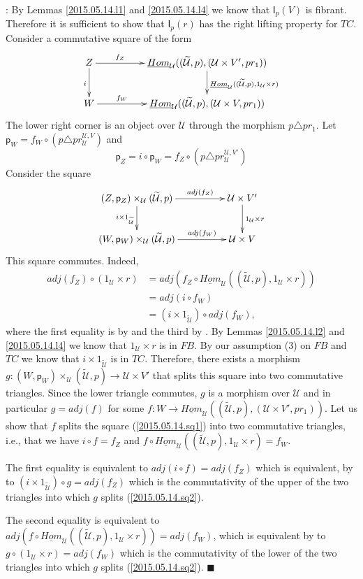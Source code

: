 \documentclass[12pt]{article}
\numberwithin{equation}{section}
\newenvironment{eq}{\begin{equation}}{\end{equation}}
\newenvironment{myproof}{{\bf Proof}:}{$\blacksquare$ \vskip 5mm }
\newcommand{\llabel}[1]{\label{#1}}
\newcommand{\sr}{\rightarrow}
\newcommand{\uu}{\underline}
\newcommand{\iHom}{\uu{Hom}}
\newcommand{\wt}{\widetilde}
\newcommand{\id}{1}            %
\newcommand{\p}{\mathsf{p}}
\newcommand{\U}{\mathcal{U}}
\newcommand{\I}{\mathsf{I}}
\begin{document}
\begin{myproof}
By Lemmas \ref{2015.05.14.l1} and \ref{2015.05.14.l4} we know that $\I_p(V)$ is
fibrant. Therefore it is sufficient to show that $\I_p(r)$ has the right lifting
property for $TC$. Consider a commutative square of the form
%
\begin{eq}
\llabel{2015.05.14.sq1}
\begin{xy}
          \xymatrix@C=4pc{ Z \ar[r]^-{f_Z} \ar[d]_{i} &
            \iHom_\U((\wt{\U},p),(\U\times V',pr_1))
            \ar[d]^{\iHom_\U((\wt{\U},p), \id_\U\times r)}\\ W \ar[r]^-{f_W} &
            \iHom_\U((\wt{\U},p), (\U\times V, pr_1)) }
\end{xy}
\end{eq}%
%
The lower right corner is an object over $\U$ through the morphism $p\triangle
pr_1$. Let $\p_W=f_W\circ (p\triangle pr^{\U,V}_\U)$ and
%
$$\p_Z=i\circ \p_W=f_Z\circ (p\triangle pr^{\U,V'}_\U)$$
%
Consider the square
%
\begin{eq}
\llabel{2015.05.14.sq2}
\begin{xy}
          \xymatrix@C=4pc{ (Z,\p_Z)\times_\U (\wt{\U},p) \ar[r]^-{adj(f_Z)}
            \ar[d]_{i\times \id_{\wt{\U}}} & \U\times V' \ar[d]^{\id_\U\times
              r}\\ (W,\p_W)\times_\U (\wt{\U},p) \ar[r]^-{adj(f_W)} & \U\times V }
\end{xy}
\end{eq}%
%
This square commutes. Indeed,
%
\begin{align*}
  adj(f_Z)\circ (\id_\U\times r )
  & = adj(f_Z\circ \iHom_\U((\wt{\U},p), \id_\U\times r)) \\
  & = adj(i\circ f_W) \\
  & = (i\times \id_{\wt{\U}})\circ adj (f_W),
\end{align*}
%
where the first equality is by \cite[Lemma 8.7(1)]{fromunivwithPi} and the
third by \cite[Lemma 8.7(3)]{fromunivwithPi}. By Lemmas \ref{2015.05.14.l2} and
\ref{2015.05.14.l4} we know that $\id_\U\times r$ is in $FB$. By our assumption
(3) on $FB$ and $TC$ we know that $i\times \id_{\wt{\U}}$ is in $TC$. Therefore,
there exists a morphism $g:(W,\p_W)\times_\U (\wt{\U},p) \sr \U\times V'$ that
splits this square into two commutative triangles. Since the lower triangle
commutes, $g$ is a morphism over $\U$ and in particular $g=adj(f)$ for some
$f:W\sr \iHom_\U((\wt{\U},p),(\U\times V',pr_1))$. Let us show that $f$ splits
the square (\ref{2015.05.14.sq1}) into two commutative triangles, i.e., that we
have $i\circ f= f_Z$ and $f\circ \iHom_\U((\wt{\U},p), \id_\U\times r)=f_W$.

The first equality is equivalent to $adj(i\circ f)=adj(f_Z)$ which is
equivalent, by \cite[Lemma 8.7(3)]{fromunivwithPi} to $(i\times
\id_{\wt{\U}})\circ g=adj(f_Z)$ which is the commutativity of the upper of the
two triangles into which $g$ splits (\ref{2015.05.14.sq2}).

The second equality is equivalent to $adj(f\circ \iHom_\U((\wt{\U},p),
\id_\U\times r))=adj(f_W)$, which is equivalent by \cite[Lemma
  8.7(1)]{fromunivwithPi} to $g\circ (\id_\U\times r)=adj(f_W)$ which is the
commutativity of the lower of the two triangles into which $g$ splits
(\ref{2015.05.14.sq2}).
\end{myproof}
\end{document}
